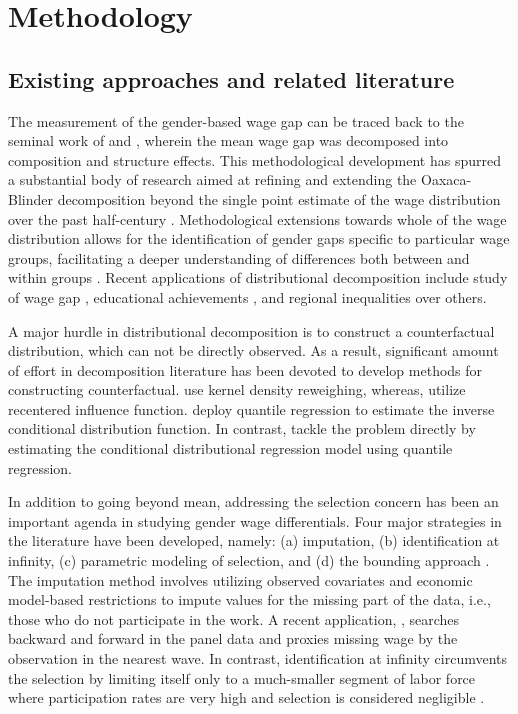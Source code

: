 \section{Methodology} \label{sec:methodology}
\subsection{Existing approaches and related literature}

The measurement of the gender-based wage gap can be traced back to the seminal work of \textcite{Oaxaca1973} and \textcite{Blinder1973}, wherein the mean wage gap was decomposed into composition and structure effects. This methodological development has spurred a substantial body of research aimed at refining and extending the Oaxaca-Blinder decomposition beyond the single point estimate of the wage distribution over the past half-century \parencite{Fortin2011}. 	Methodological extensions towards whole of the wage distribution allows for the identification of gender gaps specific to particular wage groups, facilitating a deeper understanding of differences both between and within groups \parencite{Machado2005}. Recent applications of distributional decomposition include study of wage gap \parencite{Maasoumi2019}, educational achievements \parencite{Le2018},  and regional inequalities \parencite{Jemmali2023} over others. \par

A major hurdle in distributional decomposition is to construct a counterfactual distribution, which can not be directly observed. As a result, significant amount of effort in decomposition literature has been devoted to develop methods for constructing counterfactual. \textcite{DiNardo1996} use kernel density reweighing, whereas, \textcite{Firpo2009} utilize recentered influence function. \textcite{Machado2005} deploy quantile regression to estimate the inverse conditional distribution function. In contrast, \textcite{Chernozhukov2013} tackle the problem directly by estimating the conditional distributional regression model using quantile regression.\par

In addition to going beyond mean, addressing the selection concern has been an important agenda in studying gender wage differentials. Four major strategies in the literature have been developed, namely: (a) imputation, (b) identification at infinity, (c) parametric modeling of selection, and (d) the bounding approach \parencite{Machado2017}. The imputation method involves utilizing observed covariates and economic model-based restrictions to impute values for the missing part of the data, i.e., those who do not participate in the work. A recent application, \textcite{Blau2021}, searches backward and forward in the panel data and proxies missing wage by the observation in the nearest wave. In contrast, identification at infinity circumvents the selection by limiting itself only to a much-smaller segment of labor force where participation rates are very high and selection is considered negligible \parencite{Machado2017,Mulligan2008,Heckman1990}.\par


